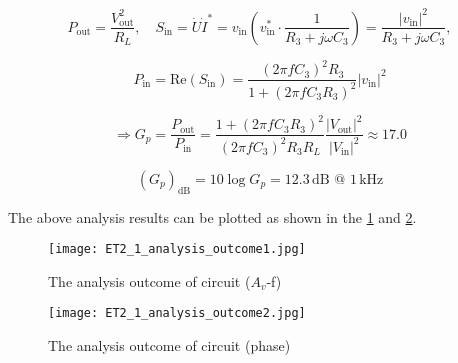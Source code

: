 \begin{enumerate}
	\[
	P_{\text{out}} = \frac{V_{\text{out}}^2}{R_L}, \quad S_{\text{in}} = \dot{U} \dot{I}^* = v_{\text{in}} \left( v_{\text{in}}^* \cdot \frac{1}{R_3 + j \omega C_3} \right) = \frac{|v_{\text{in}}|^2}{R_3 + j \omega C_3},
	\]
	
	\[
	P_{\text{in}} = \text{Re}(S_{\text{in}}) = \frac{(2\pi f C_3)^2 R_3}{1 + (2\pi f C_3 R_3)^2} |v_{\text{in}}|^2
	\]
	
	\[
	\Rightarrow G_p = \frac{P_{\text{out}}}{P_{\text{in}}} = \frac{1 + (2\pi f C_3 R_3)^2}{(2\pi f C_3)^2 R_3 R_L} \frac{|V_{\text{out}}|^2}{|V_{\text{in}}|^2} \approx 17.0
	\]
	
	\[
	(G_p)_{\text{dB}} = 10 \log G_p = 12.3 \, \text{dB @ } 1 \, \text{kHz}
	\]
	
	The above analysis results can be plotted as shown in the \cref{fig:outcome1} and \cref{fig:outcome2}.
	
	\begin{figure}[htbp]
		\centering
		\texttt{[image: ET2\_1\_analysis\_outcome1.jpg]}
		\caption{The analysis outcome of circuit ($A_v$-f)}
		\label{fig:outcome1}
	\end{figure}
	
	\begin{figure}[htbp]
		\centering
		\texttt{[image: ET2\_1\_analysis\_outcome2.jpg]}
		\caption{The analysis outcome of circuit (phase)}
		\label{fig:outcome2}
	\end{figure}
\end{enumerate}

